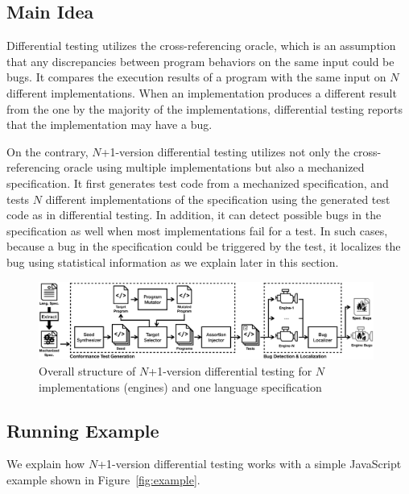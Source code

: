 \subsection{Main Idea}

Differential testing utilizes the cross-referencing oracle, which is
an assumption that any discrepancies between program behaviors on the same input
could be bugs.  It compares the execution results of a program with the same
input on $N$ different implementations.  When an implementation produces a different
result from the one by the majority of the implementations, differential testing
reports that the implementation may have a bug.

On the contrary, $N$+1-version differential testing utilizes not only the cross-referencing oracle
using multiple implementations but also a mechanized specification.  It first
generates test code from a mechanized specification, and tests 
$N$ different implementations of the specification using the generated test code
as in differential testing.  In addition, it can detect possible bugs in the specification
as well when most implementations fail for a test.  In such cases,
because a bug in the specification could be triggered by the test, it
localizes the bug using statistical information as we explain later in this section.

\begin{figure}[t]
  \centering
  \includegraphics[width=0.98\textwidth]{img/overall}
  \vspace*{.5em}
  \caption{Overall structure of $N$+1-version differential testing for $N$
    implementations (engines) and one language specification}
  \label{fig:overall}
  \vspace*{-1em}
\end{figure}


\subsection{Running Example}

We explain how $N$+1-version differential testing works with a simple
JavaScript example shown in Figure~\ref{fig:example}.

